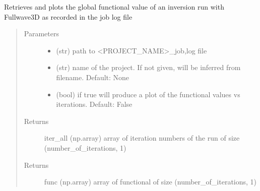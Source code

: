 \documentclass[letterpaper,10pt,english]{sphinxmanual}
\begin{document}
\begin{fulllineitems}
\label{\detokenize{index:fullwaveqc.inversion.functional}}
Retrieves and plots the global functional value of an inversion run with Fullwave3D as  recorded in the job log
file
\begin{quote}\begin{description}
\item[{Parameters}] \leavevmode\begin{itemize}
\item {} 
 \textendash{} (str)      path to \textless{}PROJECT\_NAME\textgreater{}\_job,log file

\item {} 
 \textendash{} (str)      name of the project. If not given, will be inferred from filename. Default: None

\item {} 
 \textendash{} (bool)     if true will produce a plot of the functional values vs iterations. Default: False

\end{itemize}

\item[{Returns}] \leavevmode
iter\_all     (np.array) array of iteration numbers of the run of size (number\_of\_iterations, 1)

\item[{Returns}] \leavevmode
func         (np.array) array of functional of size (number\_of\_iterations, 1)

\end{description}\end{quote}

\end{fulllineitems}

\end{document}
